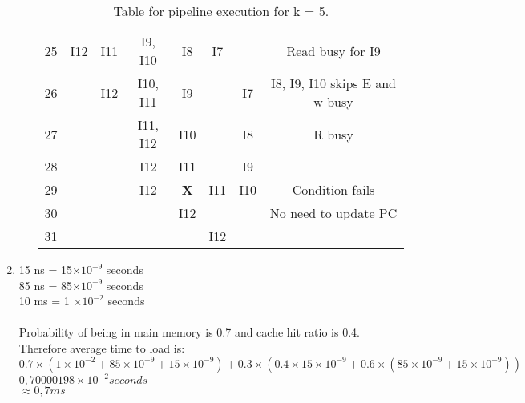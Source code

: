 \documentclass[12pt]{article}
\begin{document}
\begin{enumerate}
\begin{enumerate}
\begin{table}[h!]
\begin{tabular}{||c||c|c|c|c|c|c|c||}
             25 & I12 & I11 & I9, I10 & I8 & I7 & & Read busy for I9\\
             26 & & I12 & I10, I11 & I9 & & I7 & I8, I9, I10 skips E and w busy\\
             27 & & & I11, I12 & I10 & & I8 & R busy\\
             28 & & & I12 & I11 & & I9 & \\
             29 & & & I12 & \textbf{X} & I11 & I10 & Condition fails\\
             30 & & & & I12 & & & No need to update PC\\
             31 & & & & & I12 & & \\
             [1ex]
             \hline
            \end{tabular}
            \caption{Table for pipeline execution for k = 5.}
            \label{table:1}
            \end{table}
        \end{enumerate}
        \item 15 ns = 15$\times 10^{-9}$ seconds\\
        85 ns = 85$\times 10^{-9}$ seconds\\
        10 ms = 1 $\times 10^{-2}$ seconds\\
        \\
        Probability of being in main memory is 0.7 and cache hit ratio is 0.4. Therefore average time to load is:\\
        $0.7 \times (1 \times 10^{-2} + 85 \times 10^{-9} + 15 \times 10^{-9}) + 0.3 \times (0.4 \times 15 \times 10^{-9} + 0.6 \times (85 \times 10^{-9} + 15 \times 10^{-9}))$\\
        $0,70000198 \times 10^{-2} seconds $\\
        $\approx 0,7 ms$

    \end{enumerate}
\end{document}
